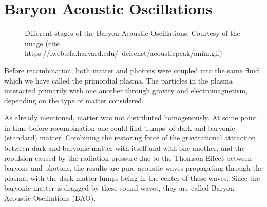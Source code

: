 \section{Baryon Acoustic Oscillations}

\begin{figure}[t]
	\centering
	\caption[Different stages of the Baryon Acoustic Oscillations.]{Different stages of the Baryon Acoustic Oscillations. Courtesy of the image (cite https://lweb.cfa.harvard.edu/~deisenst/acousticpeak/anim.gif)}
\end{figure}

Before recombination, both matter and photons were coupled into the same fluid which we have called the primordial plasma. The particles in the plasma interacted primarily with one another through gravity and electromagnetism, depending on the type of matter considered. 

As already mentioned, matter was not distributed homogenously. At some point in time before recombination one could find `lumps' of dark and baryonic (standard) matter. Combining the restoring force of the gravitational attraction between dark and baryonic matter with itself and with one another, and the repulsion caused by the radiation pressure due to the Thomson Effect between baryons and photons, the results are pure acoustic waves propagating through the plasma, with the dark matter lumps being in the center of these waves. Since the baryonic matter is dragged by these sound waves, they are called Baryon Acoustic Oscillations (BAO).


